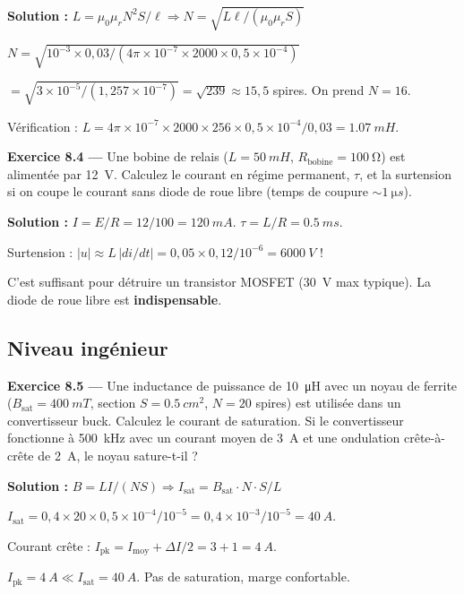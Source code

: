 \documentclass[12pt,a4paper,twoside]{book}
\begin{document}
\begin{pratique}
\textbf{Solution :} $L = \mu_0\mu_r N^2 S/\ell \Rightarrow N = \sqrt{L\ell/(\mu_0\mu_r S)}$

$N = \sqrt{10^{-3} \times 0{,}03 / (4\pi\times10^{-7} \times 2000 \times 0{,}5\times10^{-4})}$

$= \sqrt{3\times10^{-5} / (1{,}257\times10^{-7})} = \sqrt{239} \approx 15{,}5$ spires. On prend $N = 16$.

Vérification : $L = 4\pi\times10^{-7} \times 2000 \times 256 \times 0{,}5\times10^{-4} / 0{,}03 = \SI{1.07}{mH}$. \checkmark
\end{pratique}

\textbf{Exercice 8.4 ---} Une bobine de relais ($L = \SI{50}{mH}$, $R_{\text{bobine}} = \SI{100}{\ohm}$) est alimentée par \SI{12}{V}. Calculez le courant en régime permanent, $\tau$, et la surtension si on coupe le courant sans diode de roue libre (temps de coupure $\sim\SI{1}{\micro s}$).

\begin{pratique}
\textbf{Solution :} $I = E/R = 12/100 = \SI{120}{mA}$. $\tau = L/R = \SI{0.5}{ms}$.

Surtension : $|u| \approx L\,|di/dt| = 0{,}05 \times 0{,}12/10^{-6} = \SI{6000}{V}$ !

C'est suffisant pour détruire un transistor MOSFET (\SI{30}{V} max typique). La diode de roue libre est \textbf{indispensable}.
\end{pratique}

\subsection*{Niveau ingénieur}

\textbf{Exercice 8.5 ---} Une inductance de puissance de \SI{10}{\micro H} avec un noyau de ferrite ($B_{\text{sat}} = \SI{400}{mT}$, section $S = \SI{0.5}{cm^2}$, $N = 20$ spires) est utilisée dans un convertisseur buck. Calculez le courant de saturation. Si le convertisseur fonctionne à \SI{500}{kHz} avec un courant moyen de \SI{3}{A} et une ondulation crête-à-crête de \SI{2}{A}, le noyau sature-t-il ?

\begin{pratique}
\textbf{Solution :} $B = LI/(NS) \Rightarrow I_{\text{sat}} = B_{\text{sat}} \cdot N \cdot S / L$

$I_{\text{sat}} = 0{,}4 \times 20 \times 0{,}5\times10^{-4} / 10^{-5} = 0{,}4 \times 10^{-3} / 10^{-5} = \SI{40}{A}$.

Courant crête : $I_{\text{pk}} = I_{\text{moy}} + \Delta I/2 = 3 + 1 = \SI{4}{A}$.

$I_{\text{pk}} = \SI{4}{A} \ll I_{\text{sat}} = \SI{40}{A}$. Pas de saturation, marge confortable.
\end{pratique}
\end{document}
